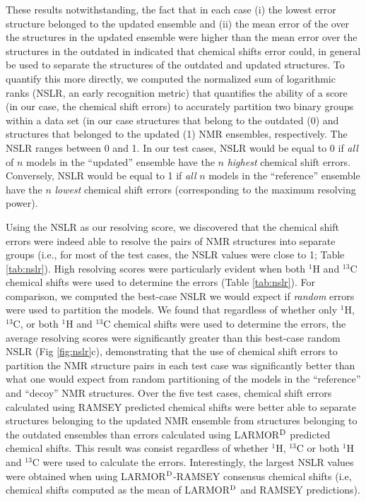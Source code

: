 \documentclass[fleqn,10pt]{wlscirep}
\begin{document}
These results notwithstanding, the fact that in each case (i) the lowest error structure belonged to the updated ensemble and (ii) the mean error of the over the structures in the updated ensemble were higher than the mean error over the structures in the outdated in indicated that chemical shifts error could, in general be used to separate the structures of the outdated and updated structures. To quantify this more directly, we computed the normalized sum of logarithmic ranks (NSLR, an early recognition metric) that quantifies the ability of a score (in our case, the chemical shift errors) to accurately partition two binary groups within a data set \cite{Venkatraman:2010gea} (in our case structures that belong to the outdated (0) and structures that belonged to the updated (1) NMR ensembles, respectively. The NSLR ranges between 0 and 1. In our test cases, NSLR would be equal to 0 if \textit{all} of $n$ models in the ``updated'' ensemble have the $n$ \textit{highest} chemical shift errors. Conversely, NSLR would be equal to 1 if \textit{all} $n$ models in the ``reference'' ensemble have the $n$ \textit{lowest} chemical shift errors (corresponding to the maximum resolving power). 

Using the NSLR as our resolving score, we discovered that the chemical shift errors were indeed able to resolve the pairs of NMR structures into separate groups (i.e., for most of the test cases, the NSLR values were close to 1; Table \ref{tab:nslr}). High resolving scores were particularly evident when both $^{1}$H and $^{13}$C chemical shifts were used to determine the errors (Table \ref{tab:nslr}). For comparison, we computed the best-case NSLR we would expect if \textit{random} errors were used to partition the models. We found that regardless of whether only $^{1}$H, $^{13}$C, or both $^{1}$H and $^{13}$C chemical shifts were used to determine the errors, the average resolving scores were significantly greater than this best-case random NSLR (Fig \ref{fig:nslr}c), demonstrating that the use of chemical shift errors to partition the NMR structure pairs in each test case was significantly better than what one would expect from random partitioning of the models in the ``reference'' and ``decoy'' NMR structures. Over the five test cases, chemical shift errors calculated using RAMSEY predicted chemical shifts were better able to separate structures belonging to the updated NMR ensemble from structures belonging to the outdated ensembles than errors calculated using LARMOR$^{\rm D}$ predicted chemical shifts. This result was consist regardless of whether $^{1}$H, $^{13}$C or both $^{1}$H and $^{13}$C were used to calculate the errors. Interestingly, the largest NSLR values were obtained when using LARMOR$^{\rm D}$-RAMSEY consensus chemical shifts (i.e, chemical shifts computed as the mean of LARMOR$^{\rm D}$ and RAMSEY predictions).
\end{document}
